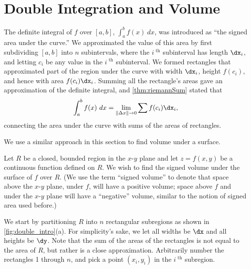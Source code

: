 \section{Double Integration and Volume}\label{sec:double_int_volume}

The definite integral of $f$ over $[a,b]$, $\int_a^b f(x)\ dx$, was introduced as ``the signed area under the curve.'' We approximated the value of this area by first subdividing $[a,b]$ into $n$ subintervals, where the $i^\text{ th}$ subinterval has length $\dx_i$, and letting $c_i$ be any value in the $i^\text{ th}$ subinterval. We formed rectangles that approximated part of the region under the curve with width $\dx_i$, height $f(c_i)$, and hence with area $f(c_i)\dx_i$. Summing all the rectangle's areas gave an approximation of the definite integral, and \autoref{thm:riemannSum} stated that
$$\int_a^bf(x)\ dx = \lim_{\|\Delta x\|\to 0}\sum f(c_i)\dx_i,$$
connecting the area under the curve with sums of the areas of rectangles.\bigskip

We use a similar approach in this section to find volume under a surface.\bigskip

Let $R$ be a closed, bounded region in the $x$-$y$ plane and let $z=f(x,y)$ be a continuous function defined on $R$. We wish to find the signed volume under the surface of $f$ over $R$. (We use the term ``signed volume'' to denote that space above the $x$-$y$ plane, under $f$, will have a positive volume; space above $f$ and under the $x$-$y$ plane will have a ``negative'' volume, similar to the notion of signed area used before.)


We start by partitioning $R$ into $n$ rectangular subregions as shown in \autoref{fig:double_intro}(a). For simplicity's sake, we let all widths be $\dx$ and all heights be $\dy$. Note that the sum of the areas of the rectangles is not equal to the area of $R$, but rather is a close approximation. Arbitrarily number the rectangles 1 through $n$, and pick a point $(x_i,y_i)$ in the $i^\text{ th}$ subregion. 

